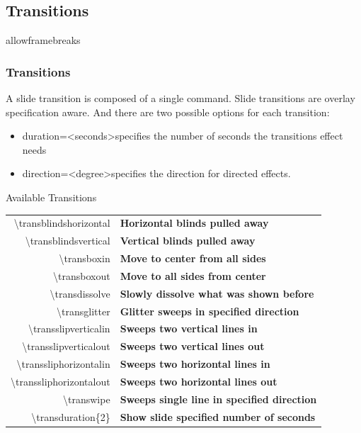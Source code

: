 \documentclass[11pt,pdf,aspectratio=43]{beamer}
\begin{document}
\subsection*{Transitions}
\begin{frame}{allowframebreaks}
    \frametitle{Transitions}
    A slide transition is composed of a single command. Slide transitions are overlay specification aware.
    And there are two possible options for each transition:
    \begin{itemize}
	\item duration=\textless seconds\textgreater specifies the number of seconds the transitions effect needs
	\item direction=\textless degree\textgreater specifies the direction for directed effects.
    \end{itemize}

    \begin{block}{Available Transitions}
	\small
	\begin{tabular}{rl}
	    \textbackslash{transblindshorizontal}   &	\textbf{Horizontal blinds pulled away}	\\
	    \textbackslash{transblindsvertical}	    &	\textbf{Vertical blinds pulled away}	\\
	    \textbackslash{transboxin}		    &	\textbf{Move to center from all sides}	\\
	    \textbackslash{transboxout}		    &	\textbf{Move to all sides from center}	\\
	    \textbackslash{transdissolve}	    &	\textbf{Slowly dissolve what was shown before}	\\
	    \textbackslash{transglitter}	    &	\textbf{Glitter sweeps in specified direction}	\\
	    \textbackslash{transslipverticalin}	    &	\textbf{Sweeps two vertical lines in}	\\
	    \textbackslash{transslipverticalout}    &	\textbf{Sweeps two vertical lines out}	\\
	    \textbackslash{transsliphorizontalin}   &	\textbf{Sweeps two horizontal lines in}	\\
	    \textbackslash{transsliphorizontalout}  &	\textbf{Sweeps two horizontal lines out}\\
	    \textbackslash{transwipe}		    &	\textbf{Sweeps single line in specified direction}  \\
	    \textbackslash{transduration\{2\}}	    &	\textbf{Show slide specified number of seconds}	
	\end{tabular}
    \end{block}
\end{frame}
\end{document}
